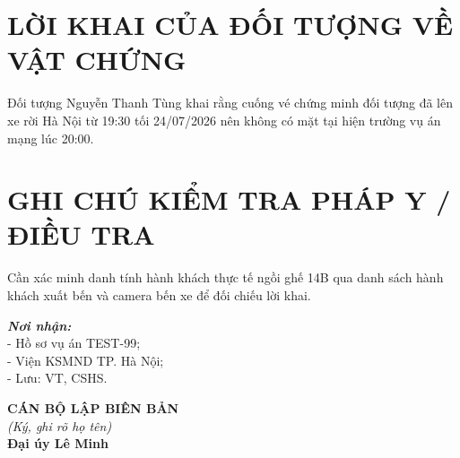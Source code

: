 \documentclass[12pt,a4paper]{article}
\begin{document}
\section*{LỜI KHAI CỦA ĐỐI TƯỢNG VỀ VẬT CHỨNG}
Đối tượng Nguyễn Thanh Tùng khai rằng cuống vé chứng minh đối tượng đã lên xe rời Hà Nội từ 19:30 tối 24/07/2026 nên không có mặt tại hiện trường vụ án mạng lúc 20:00.

\section*{GHI CHÚ KIỂM TRA PHÁP Y / ĐIỀU TRA}
Cần xác minh danh tính hành khách thực tế ngồi ghế 14B qua danh sách hành khách xuất bến và camera bến xe để đối chiếu lời khai.

\vspace{0.8cm}

\noindent
\begin{minipage}[t]{0.45\textwidth}
    \small
    \textbf{\textit{Nơi nhận:}}\\
    - Hồ sơ vụ án TEST-99;\\
    - Viện KSMND TP. Hà Nội;\\
    - Lưu: VT, CSHS.
\end{minipage}
\hfill
\begin{minipage}[t]{0.5\textwidth}
    \begin{center}
        \small
        \textbf{CÁN BỘ LẬP BIÊN BẢN}\\
        \textit{(Ký, ghi rõ họ tên)}\\[1.5cm]
        \textbf{Đại úy Lê Minh}
    \end{center}
\end{minipage}
\end{document}
